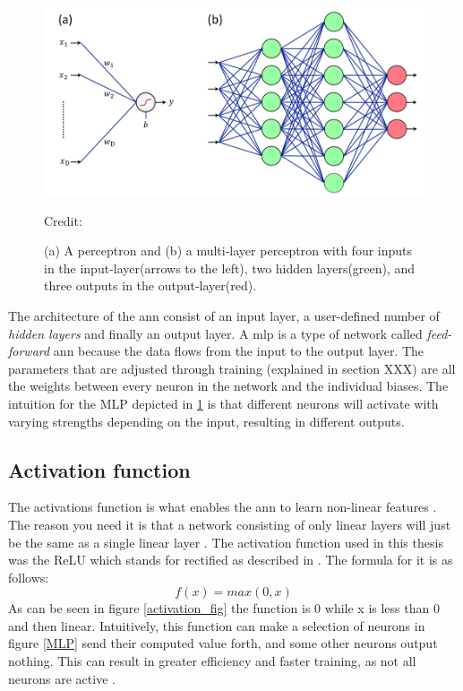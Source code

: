             \begin{figure}[H]
                \centering
                \includegraphics[scale=0.5]{figures/perceptron.png}
                \caption[The perceptron and multi-layer perceptron]{(a) A perceptron and (b) a multi-layer perceptron with four inputs in the input-layer(arrows to the left), two hidden layers(green), and three outputs in the output-layer(red).}
              	\medskip 
                \hspace*{15pt}\hbox{\scriptsize Credit: \citeauthor{razavi2021deep_exp_DL}\cite{razavi2021deep_exp_DL}}
                \label{Perceptron / MLP}
            \end{figure}
        
        The architecture of the \gls{ann} consist of an input layer, a user-defined number of \textit{hidden layers} and finally an output layer. A \gls{mlp} is a type of network called \textit{feed-forward} \gls{ann} because the data flows from the input to the output layer. The parameters that are adjusted through training (explained in section XXX) are all the weights between every neuron in the network and the individual biases. The intuition for the MLP depicted in \ref{Perceptron / MLP} is that different neurons will activate with varying strengths depending on the input, resulting in different outputs.
        
    \subsection{Activation function} \label{activation function}
        The activations function is what enables the \gls{ann} to learn non-linear features \cite{razavi2021deep_exp_per}. The reason you need it is that a network consisting of only linear layers will just be the same as a single linear layer \cite{razavi2021deep_exp_per}. The activation function used in this thesis was the ReLU which stands for rectified as described in \cite{sharma2019new_activation_func}. The formula for it is as follows:
            \begin{equation} \label{relu_eq}
                f(x) = max(0,x)
            \end{equation}
        As can be seen in figure \ref{activation_fig} the function is 0 while x is less than 0 and then linear. Intuitively, this function can make a selection of neurons in figure \ref{MLP} send their computed value forth, and some  other neurons output nothing. This can result in greater efficiency and faster training, as not all neurons are active \cite{sharma2019new_activation_func}.
        
